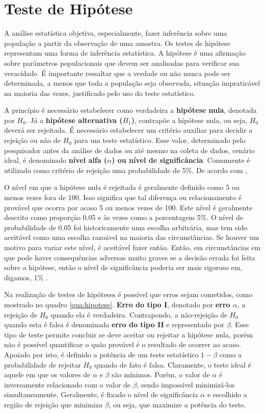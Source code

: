 \section{Teste de Hipótese}
A análise estatística objetiva, especialmente, fazer inferência sobre uma população a partir da observação de uma amostra. Os testes de hipótese representam uma forma de inferência estatística. A hipótese é uma afirmação sobre parâmetros populacionais que devem ser analisadas para verificar sua veracidade. É importante ressaltar que a verdade ou não nunca pode ser determinada, a menos que toda a população seja observada, situação impraticável na maioria das vezes, justificado pelo uso do teste estatístico.  

A princípio é necessário estabelecer como verdadeira a \textbf{hipótese nula}, denotada por \textbf{$H_0$}. Já a \textbf{hipótese alternativa ($H_1$)}, contrapõe a hipótese nula, ou seja, $H_0$ deverá ser rejeitada. É necessário estabelecer um critério auxiliar para decidir a rejeição ou não de $H_0$ para um teste estatístico. Esse valor, determinado pelo pesquisador antes da análise de dados ou até mesmo na coleta de dados, cenário ideal, é denominado \textbf{nível alfa ($\alpha$) ou nível de significância}. Comumente é utilizado como critério de rejeição uma probabilidade de 5\%. De acordo com , 

\begin{citacao}
O nível em que a hipótese nula é rejeitada é geralmente definido como 5 ou menos vezes fora de 100. Isso significa que tal diferença ou relacionamento é provável que ocorra por acaso 5 ou menos vezes de 100. Este nível é geralmente descrito como proporção 0.05 e às vezes como a porcentagem 5\%. O nível de probabilidade de 0.05 foi historicamente uma escolha arbitrária, mas tem sido aceitável como uma escolha razoável na maioria das circunstâncias. Se houver um motivo para variar este nível, é aceitável fazer então. Então, em circunstâncias em que pode haver consequências adversas muito graves se a decisão errada foi feita sobre a hipótese, então o nível de significância poderia ser mais rigoroso em, digamos, 1\% \cite[p.~151]{cramer2004sage}. 
\end{citacao}

Na realização de testes de hipóteses é possível que erros sejam cometidos, como mostrado no quadro \ref{qua:hipotese}. \textbf{Erro do tipo I}, denotado por \textbf{erro $\alpha$}, a rejeição de $H_0$ quando ela é verdadeira. Contrapondo, a não-rejeição de $H_0$ quando esta é falsa é denominada \textbf{erro do tipo II} e representado por \textbf{$\beta$}.  Esse tipo de teste permite concluir se deve aceitar ou rejeitar a hipótese nula, porém não é possível quantificar o quão provável é o resultado de ocorrer ao acaso. Apoiado por isto, é definido a potência de um teste estatístico $1-\beta$ como a probabilidade de rejeitar $H_0$ quando de fato é falsa. Claramente, o teste ideal é aquele em que os valores de $\alpha$ e $\beta$ são mínimos. Porém, o valor de $\alpha$ é inversamente relacionado com o valor de $\beta$, sendo impossível minimizá-los simultaneamente. Geralmente, é fixado o nível de significância $\alpha$ e escolhido a região de rejeição que minimiza $\beta$, ou seja, que maximize a potência do teste. 


